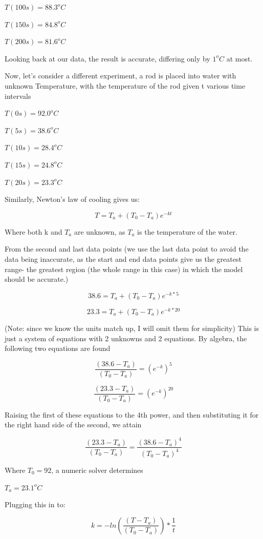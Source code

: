 \documentclass{article}
\begin{document}
$T(100s) = 88.3^oC$

$T(150s) = 84.8^oC$

$T(200s) = 81.6^oC$

Looking back at our data, the result is accurate, differing only by $1^oC$ at most. 



\vspace{2cm}

Now, let's consider a different experiment, a rod is placed into water with unknown Temperature, with the temperature of the rod given t various time intervals

$T(0s) =  92.0^oC$

$T(5s) =  38.6^oC$

$T(10s) =  28.4^oC$

$T(15s) =  24.8^oC$

$T(20s) =  23.3^oC$

Similarly, Newton's law of cooling gives us:

$$T = T_a + (T_0 - T_a)e^{-kt}$$

Where both k and $T_a$ are unknown, as $T_a$ is the temperature of the water. 

From the second and last data points (we use the last data point to avoid the data being inaccurate, as the start and end data points give us the greatest range- the greatest region (the whole range in this case) in which the model should be accurate.)

$$38.6 = T_a + (T_0 - T_a)e^{-k*5}$$

$$23.3 = T_a + (T_0 - T_a)e^{-k*20}$$

(Note: since we know the units match up, I will omit them for simplicity) This is just a system of equations with 2 unknowns and 2 equations. 
By algebra, the following two equations are found 

$$\frac{(38.6 -T_a)}{(T_0 - T_a)}=  (e^{-k})^5$$

$$\frac{(23.3 -T_a)}{(T_0 - T_a)}=  (e^{-k})^{20}$$

Raising the first of these equations to the 4th power, and then substituting it for the right hand side of the second, we attain

$$\frac{(23.3 -T_a)}{(T_0 - T_a)}=\frac{(38.6 -T_a)^4}{(T_0 - T_a)^4}$$

Where $T_0=92$, a numeric solver determines 

$T_a = 23.1^oC$

Plugging this in to:

$$k = -ln(\frac{(T-T_a)}{(T_0 - T_a)})*\frac{1}{t}$$
\end{document}
